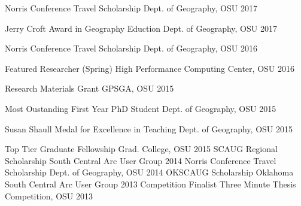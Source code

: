 
\begin{cvhonors}

  \cvhonor
    {Norris Conference Travel Scholarship} %
    {} %
    {Dept. of Geography, OSU} %
    {2017} %

  \cvhonor
    {Jerry Croft Award in Geography Eduction} %
    {} %
    {Dept. of Geography, OSU} %
    {2017} %

  \cvhonor
    {Norris Conference Travel Scholarship} %
    {} %
    {Dept. of Geography, OSU} %
    {2016} %

  \cvhonor
    {Featured Researcher (Spring)}%
    {} %
    {High Performance Computing Center, OSU} %
    {2016} %

  \cvhonor
    {Research Materials Grant}%
    {} %
    {GPSGA, OSU} %
    {2015} %

  \cvhonor
    {Most Oustanding First Year PhD Student}%
    {} %
    {Dept. of Geography, OSU} %
    {2015} %

  \cvhonor
    {Susan Shaull Medal for Excellence in Teaching}%
    {} %
    {Dept. of Geography, OSU} %
    {2015} %

  \cvhonor
    {Top Tier Graduate Fellowship}%
    {} %
    {Grad. College, OSU} %
    {2015} %
  \cvhonor
    {SCAUG Regional Scholarship}%
    {} %
    {South Central Arc User Group} %
    {2014} %
  \cvhonor
    {Norris Conference Travel Scholarship}%
    {} %
    {Dept. of Geography, OSU} %
    {2014} %
  \cvhonor
    {OKSCAUG Scholarship}%
    {} %
    {Oklahoma South Central Arc User Group} %
    {2013} %
  \cvhonor
    {Competition Finalist}%
    {} %
    {Three Minute Thesis Competition, OSU} %
    {2013} %
\end{cvhonors}
